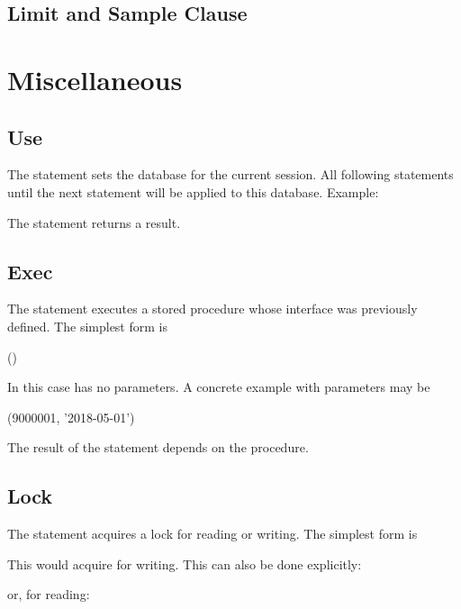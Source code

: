
\subsection{Limit and Sample Clause}

\section{Miscellaneous}
\subsection{Use}
The  statement sets the database for
the current session. All following statements
 until the next  statement
will be applied to this database.
Example:

 

The statement returns a  result.

\subsection{Exec}
The  statement executes a stored procedure
whose interface was previously defined.
The simplest form is

 ()

In this case  has no parameters.
A concrete example with parameters may be

 (9000001, '2018-05-01')

The result of the statement depends on the procedure.

\subsection{Lock}
The  statement acquires a lock
for reading or writing. The simplest form is

 

This would acquire  for writing.
This can also be done explicitly:

  

or, for reading:

  


